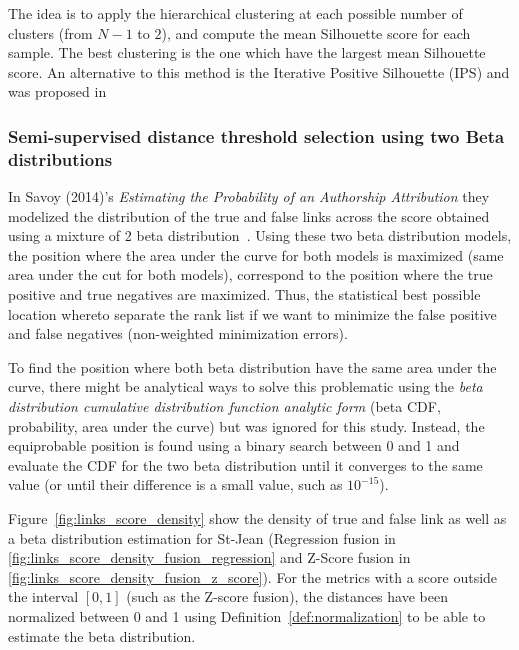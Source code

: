 The idea is to apply the hierarchical clustering at each possible number of clusters (from $N - 1$ to $2$), and compute the mean Silhouette score for each sample.
The best clustering is the one which have the largest mean Silhouette score.
An alternative to this method is the Iterative Positive Silhouette (IPS) and was proposed in~\cite{automated_unsupervised}

\subsubsection{Semi-supervised distance threshold selection using two Beta distributions}

In Savoy (2014)'s \textit{Estimating the Probability of an Authorship Attribution} they modelized the distribution of the true and false links across the score obtained using a mixture of 2 beta distribution~\cite{savoy_probability}.
Using these two beta distribution models, the position where the area under the curve for both models is maximized (same area under the cut for both models), correspond to the position where the true positive and true negatives are maximized.
Thus, the statistical best possible location whereto separate the rank list if we want to minimize the false positive and false negatives (non-weighted minimization errors).

To find the position where both beta distribution have the same area under the curve, there might be analytical ways to solve this problematic using the \textit{beta distribution cumulative distribution function analytic form} (beta CDF, probability, area under the curve) but was ignored for this study.
Instead, the equiprobable position is found using a binary search between 0 and 1 and evaluate the CDF for the two beta distribution until it converges to the same value (or until their difference is a small value, such as $10^{-15}$).

Figure~\ref{fig:links_score_density} show the density of true and false link as well as a beta distribution estimation for St-Jean (Regression fusion in \ref{fig:links_score_density_fusion_regression} and Z-Score fusion in \ref{fig:links_score_density_fusion_z_score}).
For the metrics with a score outside the interval $[0, 1]$ (such as the Z-score fusion), the distances have been normalized between 0 and 1 using Definition~\ref{def:normalization} to be able to estimate the beta distribution.


